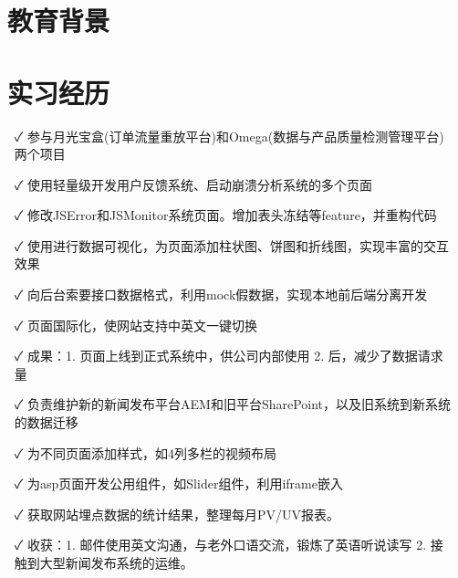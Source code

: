 \documentclass[14pt]{resume}
\begin{document}
\section{\faGraduationCap\  教育背景}

\section{\faBriefcase\ 实习经历}
\begin{itemize}
    \item[\faCheck] 参与月光宝盒(订单流量重放平台)和Omega(数据与产品质量检测管理平台)两个项目
    \item[\faCheck] 使用轻量级\textbf{\color{red}{模板引擎simplite}}开发用户反馈系统、启动崩溃分析系统的多个页面
    \item[\faCheck] 修改JSError和JSMonitor系统页面。增加表头冻结等feature，并重构代码
    \item[\faCheck] 使用\textbf{\color{red}{ECharts}}进行数据可视化，为页面添加柱状图、饼图和折线图，实现丰富的交互效果
    \item[\faCheck] 向后台索要接口数据格式，利用mock假数据，实现本地前后端分离开发
    \item[\faCheck] 页面国际化，使网站支持中英文一键切换
    \item[\faCheck] 成果：1. 页面上线到正式系统中，供公司内部使用 2. \textbf{\color{red}{重构代码}}后，减少了数据请求量
\end{itemize}

\begin{itemize}
  \item[\faCheck] 负责维护新的新闻发布平台AEM和旧平台SharePoint，以及旧系统到新系统的数据迁移
  \item[\faCheck] 为不同页面添加样式，如4列多栏的视频布局
  \item[\faCheck] 为asp页面开发公用组件，如Slider组件，利用iframe嵌入
  \item[\faCheck] 获取网站埋点数据的统计结果，整理每月PV/UV报表。
  \item[\faCheck] 收获：1. 邮件使用英文沟通，与老外口语交流，锻炼了英语听说读写 2. 接触到大型新闻发布系统的运维。
\end{itemize}
\end{document}
